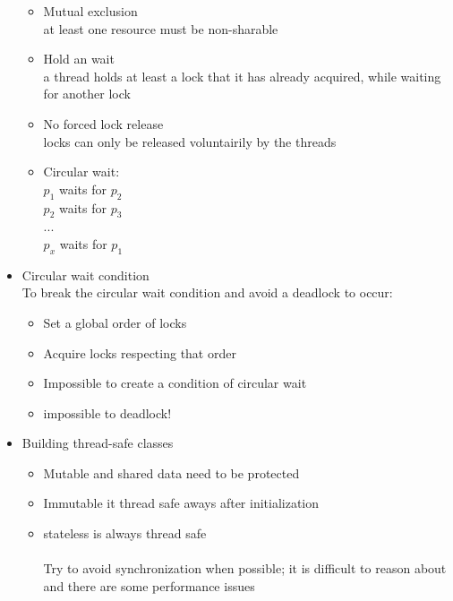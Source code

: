 \documentclass[a4paper]{article}
\begin{document}
\begin{itemize}
			\begin{itemize}
				\item Mutual exclusion \\at least one resource must be non-sharable
				\item Hold an wait \\a thread holds at least a lock that it has already acquired, while waiting for another lock
				\item No forced lock release \\ locks can only be released voluntairily by the threads
				\item Circular wait:
				\\$p_1$ waits for $p_2$
				\\$p_2$ waits for $p_3$
				\\...
				\\$p_x$ waits for $p_1$
			\end{itemize}
		\item Circular wait condition
		\\To break the circular wait condition and avoid a deadlock to occur:
			\begin{itemize}
				\item Set a global order of locks
				\item Acquire locks respecting that order
				\item Impossible to create a condition of circular wait
				\item impossible to deadlock!
			\end{itemize}
		\item Building thread-safe classes
			\begin{itemize}
				\item Mutable and shared data need to be protected
				\item Immutable it thread safe aways after initialization
				\item stateless is always thread safe
				\\
				\\Try to avoid synchronization when possible; it is difficult to reason about and there are some performance issues


\end{itemize}
\end{itemize}
\end{document}
